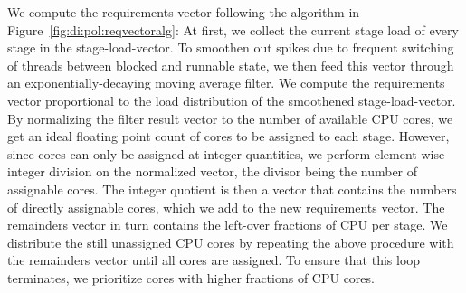 \documentclass[12pt,a4paper]{book}
\DeclarePairedDelimiter\floor{\lfloor}{\rfloor}
\begin{document}

We compute the requirements vector following the algorithm in Figure~\ref{fig:di:pol:reqvectoralg}:
At first, we collect the current stage load of every stage in the stage-load-vector.
To smoothen out spikes due to frequent switching of threads between blocked and runnable state, we then feed this vector through an exponentially-decaying moving average filter.
We compute the requirements vector proportional to the load distribution of the smoothened stage-load-vector.
By normalizing the filter result vector to the number of available CPU cores, we get an ideal floating point count of cores to be assigned to each stage.
However, since cores can only be assigned at integer quantities, we perform element-wise integer division on the normalized vector, the divisor being the number of assignable cores.
The integer quotient is then a vector that contains the numbers of directly assignable cores, which we add to the new requirements vector.
The remainders vector in turn contains the left-over fractions of CPU per stage.
We distribute the still unassigned CPU cores by repeating the above procedure with the remainders vector until all cores are assigned.
To ensure that this loop terminates, we prioritize cores with higher fractions of CPU cores.
\end{document}
